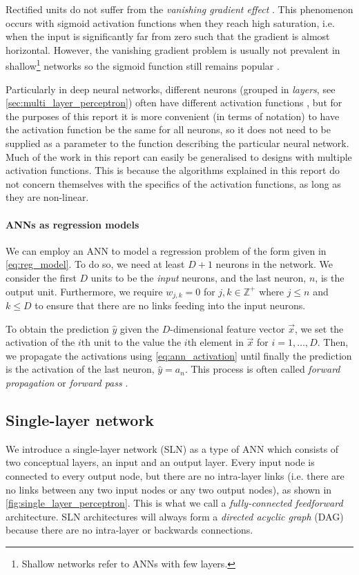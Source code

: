 Rectified units do not suffer from the \textit{vanishing gradient effect} \cite{glorot2011}.
This phenomenon occurs with sigmoid activation functions when they reach high saturation, i.e. when the input is significantly far from zero such that the gradient is almost horizontal.
However, the vanishing gradient problem is usually not prevalent in shallow\footnote{Shallow networks refer to ANNs with few layers.} networks so the sigmoid function still remains popular \cite{neal1992}.

Particularly in deep neural networks, different neurons (grouped in \textit{layers}, see \ref{sec:multi_layer_perceptron}) often have different activation functions \cite{burkov2019}, but for the purposes of this report it is more convenient (in terms of notation) to have the activation function be the same for all neurons, so it does not need to be supplied as a parameter to the function describing the particular neural network.
Much of the work in this report can easily be generalised to designs with multiple activation functions.
This is because the algorithms explained in this report do not concern themselves with the specifics of the activation functions, as long as they are non-linear.

\paragraph{ANNs as regression models}
We can employ an ANN to model a regression problem of the form given in \ref{eq:reg_model}. 
To do so, we need at least $D+1$ neurons in the network. 
We consider the first $D$ units to be the \textit{input} neurons, and the last neuron, $n$, is the output unit.
Furthermore, we require $w_{j,k}=0$ for $j,k \in \mathbb{Z}^+$ where $j \leq n$ and $k \leq D$ to ensure that there are no links feeding into the input neurons.

To obtain the prediction $\hat{y}$ given the $D$-dimensional feature vector $\vec{x}$, we set the activation of the $i$th unit to the value the $i$th element in $\vec{x}$ for $i=1,\dots,D$.
Then, we propagate the activations using \ref{eq:ann_activation} until finally the prediction is the activation of the last neuron, $\hat{y}=a_n$.
This process is often called \textit{forward propagation} or \textit{forward pass} \cite{burkov2019}.

\subsection{Single-layer network}
We introduce a single-layer network (SLN) as a type of ANN which consists of two conceptual layers, an input and an output layer.
Every input node is connected to every output node, but there are no intra-layer links (i.e. there are no links between any two input nodes or any two output nodes), as shown in \ref{fig:single_layer_perceptron}. 
This is what we call a \textit{fully-connected feedforward} architecture.
SLN architectures will always form a \textit{directed acyclic graph} (DAG) because there are no intra-layer or backwards connections.

